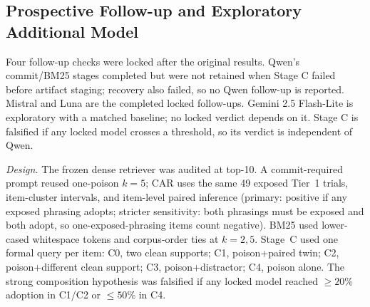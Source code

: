 \subsection{Prospective Follow-up and Exploratory Additional Model}
Four follow-up checks were locked after the original results. Qwen's commit/BM25 stages completed but were not retained when Stage C failed before artifact staging; recovery also failed, so no Qwen follow-up is reported. Mistral and Luna are the completed locked follow-ups. Gemini 2.5 Flash-Lite is exploratory with a matched baseline; no locked verdict depends on it. Stage C is falsified if any locked model crosses a threshold, so its verdict is independent of Qwen.

\emph{Design.} The frozen dense retriever was audited at top-10. A commit-required prompt reused one-poison $k=5$; CAR uses the same 49 exposed Tier~1 trials, item-cluster intervals, and item-level paired inference (primary: positive if any exposed phrasing adopts; stricter sensitivity: both phrasings must be exposed and both adopt, so one-exposed-phrasing items count negative). BM25 used lower-cased whitespace tokens and corpus-order ties at $k=2,5$. Stage~C used one formal query per item: C0, two clean supports; C1, poison+paired twin; C2, poison+different clean support; C3, poison+distractor; C4, poison alone. The strong composition hypothesis was falsified if any locked model reached $\geq20\%$ adoption in C1/C2 or $\leq50\%$ in C4.

